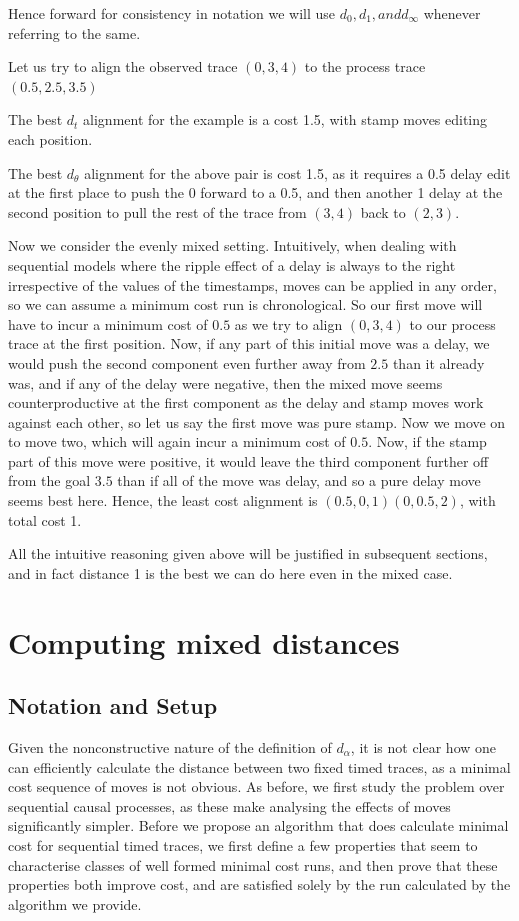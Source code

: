 \documentclass[runningheads]{llncs}
\begin{document}
	Hence forward for consistency in notation we will use $d_0, d_1, and d_{\infty}$ whenever referring to the same. 
	
	\begin{example}\label{stamptoy}
		Let us try to align the observed trace $(0, 3, 4)$ to the process trace $(0.5, 2.5, 3.5)$
		
		The best $d_t$ alignment for the example is a cost 1.5, with stamp moves editing each position. 
		
		The best $d_\theta$ alignment for the above pair is cost 1.5, as it requires a 0.5 delay edit at the first place to push the 0 forward to a 0.5, and then another 1 delay at the second position to pull the rest of the trace from $(3,4)$ back to $(2,3)$. 
		
		Now we consider the evenly mixed setting. 
		Intuitively, when dealing with sequential models where the ripple effect of a delay is always to the right irrespective of the values of the timestamps, moves can be applied in any order, so we can assume a minimum cost run is chronological. 
		So our first move will have to incur a minimum cost of $0.5$ as we try to align $(0,3,4)$ to our process trace at the first position.
		Now, if any part of this initial move was a delay, we would push the second component even further away from $2.5$ than it already was, and if any of the delay were negative, then the mixed move seems counterproductive at the first component as the delay and stamp moves work against each other, so let us say the first move was pure stamp. 
		Now we move on to move two, which will again incur a minimum cost of $0.5$. 
		Now, if the stamp part of this move were positive, it would leave the third component further off from the goal $3.5$ than if all of the move was delay, and so a pure delay move seems best here. 
		Hence, the least cost alignment is $(0.5, 0, 1)(0, 0.5, 2)$, with total cost 1. 
		
		All the intuitive reasoning given above will be justified in subsequent sections, and in fact distance 1 is the best we can do here even in the mixed case. 
	\end{example}
	
\section{Computing mixed distances}
\subsection{Notation and Setup}
	Given the nonconstructive nature of the definition of $d_{\alpha}$, it is not clear how one can efficiently calculate the distance between two fixed timed traces, as a minimal cost sequence of moves is not obvious. 
	As before, we first study the problem over sequential causal processes, as these make analysing the effects of moves significantly simpler. 
	Before we propose an algorithm that does calculate minimal cost for sequential timed traces, we first define a few properties that seem to characterise classes of well formed minimal cost runs, and then prove that these properties both improve cost, and are satisfied solely by the run calculated by the algorithm we provide. 
	
\end{document}

